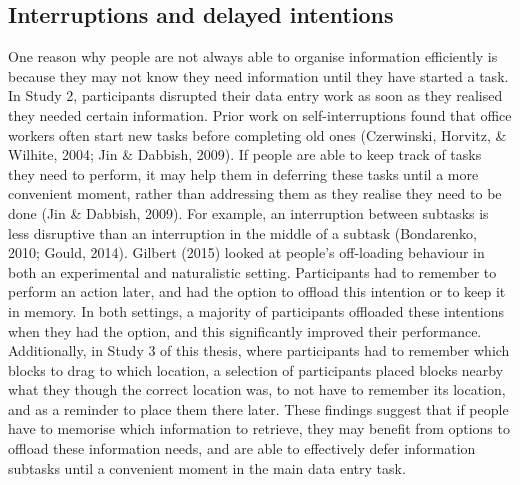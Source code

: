 \subsection{Interruptions and delayed intentions}
One reason why people are not always able to organise information efficiently is because they may not know they need information until they have started a task. In Study 2, participants disrupted their data entry work as soon as they realised they needed certain information. Prior work on self-interruptions found that office workers often start new tasks before completing old ones (Czerwinski, Horvitz, \& Wilhite, 2004; Jin \& Dabbish, 2009). If  people are able to keep track of tasks they need to perform, it may help them in deferring these tasks until a more convenient moment, rather than addressing them as they realise they need to be done (Jin \& Dabbish, 2009). For example, an interruption between subtasks is less disruptive than an interruption in the middle of a subtask (Bondarenko, 2010; Gould, 2014).
Gilbert (2015) looked at people's off-loading behaviour in both an experimental and naturalistic setting. Participants had to remember to perform an action later, and had the option to offload this intention or to keep it in memory. In both settings, a majority of participants offloaded these intentions when they had the option, and this significantly improved their performance. Additionally, in Study 3 of this thesis, where participants had to remember which blocks to drag to which location, a selection of participants placed blocks nearby what they though the correct location was, to not have to remember its location, and as a reminder to place them there later. 
These findings suggest that if people have to memorise which information to retrieve, they may benefit from options to offload these information needs, and are able to effectively defer information subtasks until a convenient moment in the main data entry task. 

